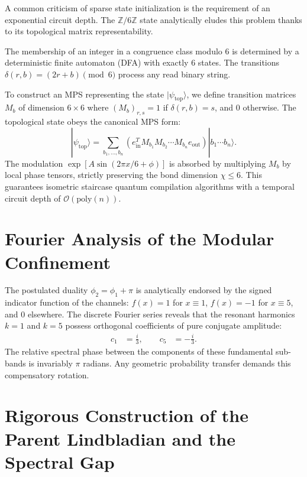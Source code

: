 \documentclass[12pt,a4paper]{article}
\theoremstyle{plain}
\theoremstyle{definition}
\theoremstyle{remark}
\begin{document}
A common criticism of sparse state initialization is the requirement of an exponential circuit depth. The $\mathbb{Z}/6\mathbb{Z}$ state analytically eludes this problem thanks to its topological matrix representability.

The membership of an integer in a congruence class modulo $6$ is determined by a deterministic finite automaton (DFA) with exactly $6$ states. The transitions $\delta(r,b) = (2r+b) \pmod 6$ process any read binary string.

To construct an MPS representing the state $|\psi_{\text{top}}\rangle$, we define transition matrices $M_b$ of dimension $6\times 6$ where $(M_b)_{r,s} = 1$ if $\delta(r,b) = s$, and $0$ otherwise. The topological state obeys the canonical MPS form:
\begin{equation}
|\psi_{\text{top}}\rangle = \sum_{b_1,\dots,b_n} \left( e_{\text{in}}^T M_{b_1} M_{b_2} \cdots M_{b_n} e_{\text{out}} \right) |b_1\cdots b_n\rangle.
\end{equation}
The modulation $\exp[A\sin(2\pi x/6 + \phi)]$ is absorbed by multiplying $M_b$ by local phase tensors, strictly preserving the bond dimension $\chi \le 6$. This guarantees isometric staircase quantum compilation algorithms with a temporal circuit depth of $\mathcal{O}(\text{poly}(n))$.

\section{Fourier Analysis of the Modular Confinement}
\label{app:fourier}

The postulated duality $\phi_2 = \phi_1 + \pi$ is analytically endorsed by the signed indicator function of the channels: $f(x) = 1$ for $x \equiv 1$, $f(x) = -1$ for $x \equiv 5$, and $0$ elsewhere. The discrete Fourier series reveals that the resonant harmonics $k=1$ and $k=5$ possess orthogonal coefficients of pure conjugate amplitude:
\begin{align}
c_1 &= \frac{i}{3}, \qquad c_5 &= -\frac{i}{3}.
\end{align}
The relative spectral phase between the components of these fundamental sub-bands is invariably $\pi$ radians. Any geometric probability transfer demands this compensatory rotation.

\section{Rigorous Construction of the Parent Lindbladian and the Spectral Gap}
\label{app:lindblad_construction}
\end{document}
